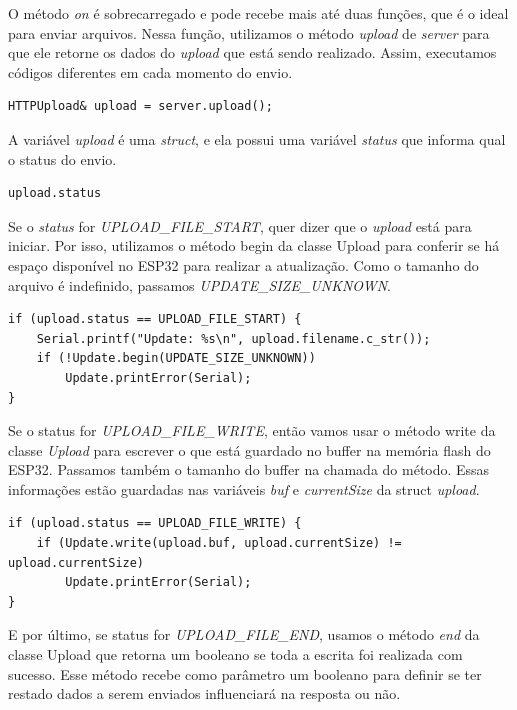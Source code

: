 \documentclass[12pt]{article}
\begin{document}
O método \textit{on} é sobrecarregado e pode recebe mais até duas funções, que é o ideal para enviar arquivos. Nessa função, utilizamos o método \textit{upload} de \textit{server} para que ele retorne os dados do \textit{upload} que está sendo realizado. Assim, executamos códigos diferentes em cada momento do envio.

\begin{lstlisting}
HTTPUpload& upload = server.upload();
\end{lstlisting}

A variável \textit{upload} é uma \textit{struct}, e ela possui uma variável \textit{status} que informa qual o status do envio.

\begin{lstlisting}
upload.status
\end{lstlisting}

Se o \textit{status} for \textit{UPLOAD\_FILE\_START}, quer dizer que o \textit{upload} está para iniciar. Por isso, utilizamos o método begin da classe Upload para conferir se há espaço disponível no ESP32 para realizar a atualização. Como o tamanho do arquivo é indefinido, passamos \textit{UPDATE\_SIZE\_UNKNOWN}.

\begin{lstlisting}
if (upload.status == UPLOAD_FILE_START) {
    Serial.printf("Update: %s\n", upload.filename.c_str());
    if (!Update.begin(UPDATE_SIZE_UNKNOWN)) 
        Update.printError(Serial);
} 
\end{lstlisting}

Se o status for \textit{UPLOAD\_FILE\_WRITE}, então vamos usar o método write da classe \textit{Upload} para escrever o que está guardado no buffer na memória flash do ESP32. Passamos também o tamanho do buffer na chamada do método. Essas informações estão guardadas nas variáveis \textit{buf} e \textit{currentSize} da struct \textit{upload}.

\begin{lstlisting}
if (upload.status == UPLOAD_FILE_WRITE) {
    if (Update.write(upload.buf, upload.currentSize) != upload.currentSize) 
        Update.printError(Serial);
}
\end{lstlisting}

E por último, se status for \textit{UPLOAD\_FILE\_END}, usamos o método \textit{end} da classe Upload que retorna um booleano se toda a escrita foi realizada com sucesso. Esse método recebe como parâmetro um booleano para definir se ter restado dados a serem enviados influenciará na resposta ou não.
\end{document}
